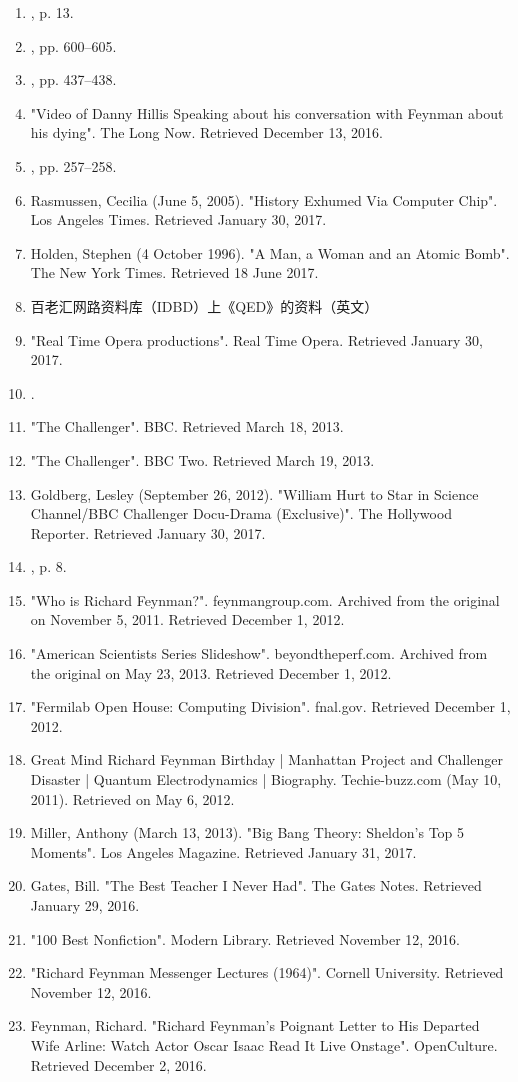\begin{enumerate}
\item , p. 13.
\item , pp. 600–605.
\item , pp. 437–438.
\item "Video of Danny Hillis Speaking about his conversation with Feynman about his dying". The Long Now. Retrieved December 13, 2016.
\item , pp. 257–258.
\item Rasmussen, Cecilia (June 5, 2005). "History Exhumed Via Computer Chip". Los Angeles Times. Retrieved January 30, 2017.
\item Holden, Stephen (4 October 1996). "A Man, a Woman and an Atomic Bomb". The New York Times. Retrieved 18 June 2017.
\item 百老汇网路资料库（IDBD）上《QED》的资料（英文）
\item "Real Time Opera productions". Real Time Opera. Retrieved January 30, 2017.
\item .
\item "The Challenger". BBC. Retrieved March 18, 2013.
\item "The Challenger". BBC Two. Retrieved March 19, 2013.
\item Goldberg, Lesley (September 26, 2012). "William Hurt to Star in Science Channel/BBC Challenger Docu-Drama (Exclusive)". The Hollywood Reporter. Retrieved January 30, 2017.
\item , p. 8.
\item "Who is Richard Feynman?". feynmangroup.com. Archived from the original on November 5, 2011. Retrieved December 1, 2012.
\item "American Scientists Series Slideshow". beyondtheperf.com. Archived from the original on May 23, 2013. Retrieved December 1, 2012.
\item "Fermilab Open House: Computing Division". fnal.gov. Retrieved December 1, 2012.
\item Great Mind Richard Feynman Birthday | Manhattan Project and Challenger Disaster | Quantum Electrodynamics | Biography. Techie-buzz.com (May 10, 2011). Retrieved on May 6, 2012.
\item Miller, Anthony (March 13, 2013). "Big Bang Theory: Sheldon's Top 5 Moments". Los Angeles Magazine. Retrieved January 31, 2017.
\item Gates, Bill. "The Best Teacher I Never Had". The Gates Notes. Retrieved January 29, 2016.
\item "100 Best Nonfiction". Modern Library. Retrieved November 12, 2016.
\item "Richard Feynman Messenger Lectures (1964)". Cornell University. Retrieved November 12, 2016.
\item Feynman, Richard. "Richard Feynman's Poignant Letter to His Departed Wife Arline: Watch Actor Oscar Isaac Read It Live Onstage". OpenCulture. Retrieved December 2, 2016.
\end{enumerate}

